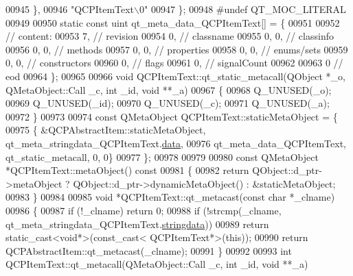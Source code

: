 \begin{DoxyCode}
00945     \},
00946     \textcolor{stringliteral}{"QCPItemText\(\backslash\)0"}
00947 \};
00948 \textcolor{preprocessor}{#undef QT\_MOC\_LITERAL}
00949 
00950 \textcolor{keyword}{static} \textcolor{keyword}{const} uint qt\_meta\_data\_QCPItemText[] = \{
00951 
00952  \textcolor{comment}{// content:}
00953        7,       \textcolor{comment}{// revision}
00954        0,       \textcolor{comment}{// classname}
00955        0,    0, \textcolor{comment}{// classinfo}
00956        0,    0, \textcolor{comment}{// methods}
00957        0,    0, \textcolor{comment}{// properties}
00958        0,    0, \textcolor{comment}{// enums/sets}
00959        0,    0, \textcolor{comment}{// constructors}
00960        0,       \textcolor{comment}{// flags}
00961        0,       \textcolor{comment}{// signalCount}
00962 
00963        0        \textcolor{comment}{// eod}
00964 \};
00965 
00966 \textcolor{keywordtype}{void} QCPItemText::qt\_static\_metacall(QObject *\_o, QMetaObject::Call \_c, \textcolor{keywordtype}{int} \_id, \textcolor{keywordtype}{void} **\_a)
00967 \{
00968     Q\_UNUSED(\_o);
00969     Q\_UNUSED(\_id);
00970     Q\_UNUSED(\_c);
00971     Q\_UNUSED(\_a);
00972 \}
00973 
00974 \textcolor{keyword}{const} QMetaObject QCPItemText::staticMetaObject = \{
00975     \{ &QCPAbstractItem::staticMetaObject, qt\_meta\_stringdata\_QCPItemText.\hyperlink{a00016_ae37b5edc1ab54bceebcfba0fb33002ec}{data},
00976       qt\_meta\_data\_QCPItemText,  qt\_static\_metacall, 0, 0\}
00977 \};
00978 
00979 
00980 \textcolor{keyword}{const} QMetaObject *QCPItemText::metaObject()\textcolor{keyword}{ const}
00981 \textcolor{keyword}{}\{
00982     \textcolor{keywordflow}{return} QObject::d\_ptr->metaObject ? QObject::d\_ptr->dynamicMetaObject() : &staticMetaObject;
00983 \}
00984 
00985 \textcolor{keywordtype}{void} *QCPItemText::qt\_metacast(\textcolor{keyword}{const} \textcolor{keywordtype}{char} *\_clname)
00986 \{
00987     \textcolor{keywordflow}{if} (!\_clname) \textcolor{keywordflow}{return} 0;
00988     \textcolor{keywordflow}{if} (!strcmp(\_clname, qt\_meta\_stringdata\_QCPItemText.\hyperlink{a00016_aff2bfa25f79dd85cdbd854d9e51371a9}{stringdata}))
00989         \textcolor{keywordflow}{return} \textcolor{keyword}{static\_cast<}\textcolor{keywordtype}{void}*\textcolor{keyword}{>}(\textcolor{keyword}{const\_cast<} QCPItemText*\textcolor{keyword}{>}(\textcolor{keyword}{this}));
00990     \textcolor{keywordflow}{return} QCPAbstractItem::qt\_metacast(\_clname);
00991 \}
00992 
00993 \textcolor{keywordtype}{int} QCPItemText::qt\_metacall(QMetaObject::Call \_c, \textcolor{keywordtype}{int} \_id, \textcolor{keywordtype}{void} **\_a)

\end{DoxyCode}
